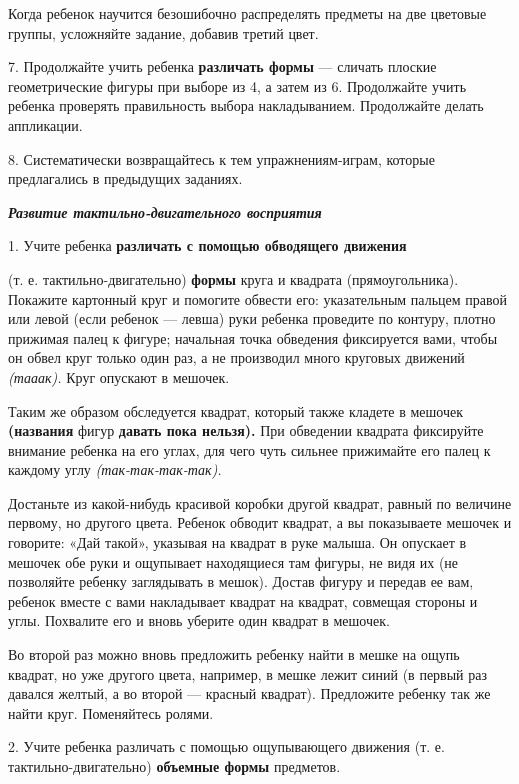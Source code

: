\documentclass{book}
\renewcommand{\emph}[1]{\textit{#1}}
\begin{document}
Когда ребенок научится безошибочно распределять предметы на две цветовые
группы, усложняйте задание, добавив третий цвет.

7. Продолжайте учить ребенка \textbf{различать формы} --- сличать
плоские геометрические фигуры при выборе из 4, а затем из 6. Продолжайте
учить ребенка проверять правильность выбора накладыванием. Продолжайте
делать аппликации.

8. Систематически возвращайтесь к тем упражнениям-играм, которые
предлагались в предыдущих заданиях.

\emph{\textbf{Развитие тактильно-двигательного восприятия}}

1. Учите ребенка \textbf{различать с помощью обводящего движения}

(т. е. тактильно-двигательно) \textbf{формы} круга и квадрата
(прямоугольника). Покажите картонный круг и помогите обвести его:
указательным пальцем правой или левой (если ребенок --- левша) руки
ребенка проведите по контуру, плотно прижимая палец к фигуре; начальная
точка обведения фиксируется вами, чтобы он обвел круг только один раз, а
не производил много круговых движений \emph{(тааак).} Круг опускают в
мешочек.

Таким же образом обследуется квадрат, который также кладете в мешочек
\textbf{(названия} фигур \textbf{давать пока нельзя).} При обведении
квадрата фиксируйте внимание ребенка на его углах, для чего чуть сильнее
прижимайте его палец к каждому углу \emph{(так-так-так-так).}

Достаньте из какой-нибудь красивой коробки другой квадрат, равный по
величине первому, но другого цвета. Ребенок обводит квадрат, а вы
показываете мешочек и говорите: «Дай такой», указывая на квадрат в руке
малыша. Он опускает в мешочек обе руки и ощупывает находящиеся там
фигуры, не видя их (не позволяйте ребенку заглядывать в мешок). Достав
фигуру и передав ее вам, ребенок вместе с вами накладывает квадрат на
квадрат, совмещая стороны и углы. Похвалите его и вновь уберите один
квадрат в мешочек.

Во второй раз можно вновь предложить ребенку найти в мешке на ощупь
квадрат, но уже другого цвета, например, в мешке лежит синий (в первый
раз давался желтый, а во второй --- красный квадрат). Предложите ребенку
так же найти круг. Поменяйтесь ролями.

2. Учите ребенка различать с помощью ощупывающего движения (т. е.
тактильно-двигательно) \textbf{объемные формы} предметов.
\end{document}
